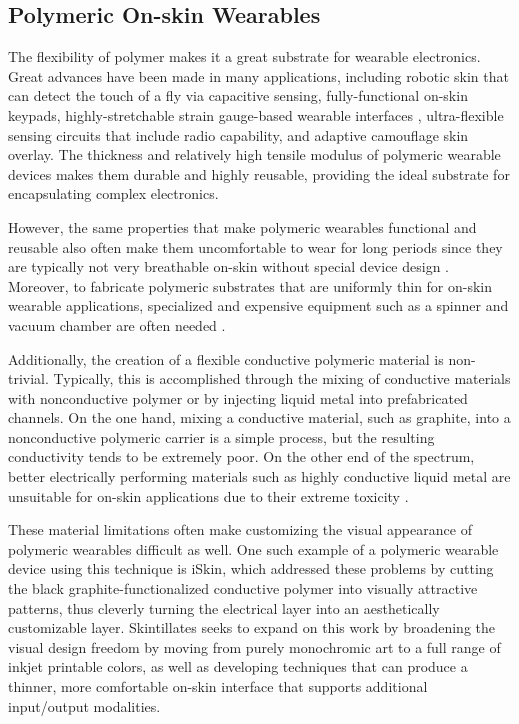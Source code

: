 \documentclass{sigchi}
\begin{document}
\subsection{Polymeric On-skin Wearables}
The flexibility of polymer makes it a great substrate for wearable electronics. Great advances have been made in many applications, including robotic skin that can detect the touch of a fly via capacitive sensing\cite{Mannsfeld:2010is}, fully-functional on-skin keypads\cite{Anonymous:L82kTfjJ}, highly-stretchable strain gauge-based wearable interfaces \cite{Boley:2014dr,Muth:2014bv}, ultra-flexible sensing circuits that include radio capability\cite{Jang:1gb,Anonymous:BBKIC9BZ}, and adaptive camouflage skin overlay\cite{Yu:2014ht}. The thickness and relatively high tensile modulus of polymeric wearable devices makes them durable and highly reusable, providing the ideal substrate for encapsulating complex electronics.

However, the same properties that make polymeric wearables functional and reusable also often make them uncomfortable to wear for long periods since they are typically not very breathable on-skin without special device design \cite{Jang:1gb}. Moreover, to fabricate polymeric substrates that are uniformly thin for on-skin wearable applications, specialized and expensive equipment such as a spinner and vacuum chamber are often needed \cite{Son:2014iya,Yu:2014ht,Anonymous:BBKIC9BZ,Jang:1gb,Muth:2014bv,Anonymous:L82kTfjJ}. 

Additionally, the creation of a flexible conductive polymeric material is non-trivial.  Typically, this is accomplished through the mixing of conductive materials with nonconductive polymer or by injecting liquid metal into prefabricated channels. On the one hand, mixing a conductive material, such as graphite, into a nonconductive polymeric carrier is a simple process, but the resulting conductivity tends  to  be  extremely poor\cite{Weigel:2015fh,Frutiger:2015fm}. On the other end of the spectrum, better electrically performing materials such as highly conductive liquid  metal  are unsuitable for on-skin applications due to their extreme toxicity \cite{Boley:2014dr}. 

These material limitations often make customizing the visual appearance of polymeric wearables difficult as well. One such example of a polymeric wearable device using this technique is iSkin\cite{Weigel:2015fh}, which addressed these problems by cutting the black graphite-functionalized conductive polymer into visually attractive patterns, thus cleverly turning the electrical layer into an aesthetically customizable layer. Skintillates seeks to expand on this work by broadening the visual design freedom by moving from purely monochromic art to a full range of inkjet printable colors, as well as developing techniques that can produce a thinner, more comfortable on-skin interface that supports additional input/output modalities. 
\end{document}
